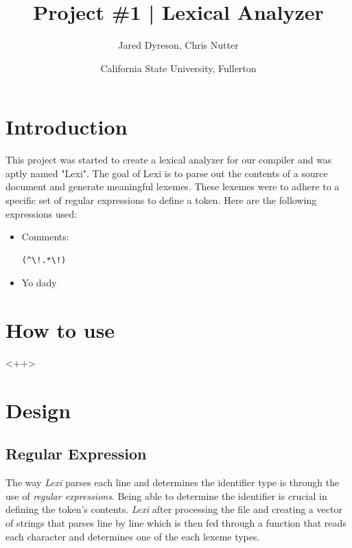 \documentclass{article}
\title{Project \#1 | Lexical Analyzer}
\author{Jared Dyreson, Chris Nutter}
\date{California State University, Fullerton}
\begin{document}
\maketitle
\tableofcontents
\newpage

\section{Introduction}
This project was started to create a lexical analyzer for our compiler and was aptly named "Lexi".
The goal of Lexi is to parse out the contents of a source document and generate meaningful  lexemes.
These lexemes were to adhere to a specific set of regular expressions to define a token.
Here are the following expressions used:
\begin{itemize}
\item Comments: \begin{Verbatim}[frame=single]
    (^\!.*\!)
\end{Verbatim}
\item Yo dady
\end{itemize}
\newpage
\section{How to use}
<++>
\section{Design}
    \subsection{Regular Expression}
        The way \emph{Lexi} parses each line and determines the identifier type is through the use of \emph{regular expressions}. Being able to determine the identifier is crucial in defining the token's contents. \emph{Lexi} after processing the file and creating a vector of strings that parses line by line which is then fed through a function that reads each character and determines one of the each lexeme types.
\end{document}
